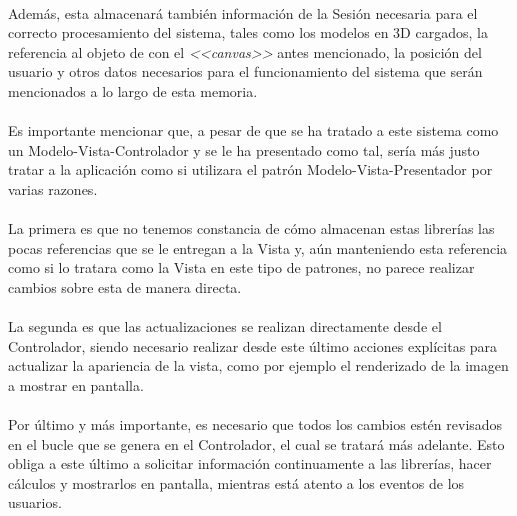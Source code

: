 \documentclass{subfiles}
\begin{document}
        \paragraph{}
        Además, esta almacenará también información de la Sesión necesaria para el correcto procesamiento del sistema, tales como los modelos en 3D cargados, la referencia al objeto de \js con el \textit{<<canvas>>} antes mencionado, la posición del usuario y otros datos necesarios para el funcionamiento del sistema que serán mencionados a lo largo de esta memoria.

        \paragraph{}
        Es importante mencionar que, a pesar de que se ha tratado a este sistema como un Modelo-Vista-Controlador y se le ha presentado como tal, sería más justo tratar a la aplicación como si utilizara el patrón Modelo-Vista-Presentador \cite{web:mvp} por varias razones.

        \paragraph{}
        La primera es que no tenemos constancia de cómo almacenan estas librerías las pocas referencias que se le entregan a la Vista y, aún manteniendo esta referencia como si lo tratara como la Vista en este tipo de patrones, no parece realizar cambios sobre esta de manera directa.

        \paragraph{}
        La segunda es que las actualizaciones se realizan directamente desde el Controlador, siendo necesario realizar desde este último acciones explícitas para actualizar la apariencia de la vista, como por ejemplo el renderizado de la imagen a mostrar en pantalla.

        \paragraph{}
        Por último y más importante, es necesario que todos los cambios estén revisados en el bucle que se genera en el Controlador, el cual se tratará más adelante. Esto obliga a este último a solicitar información continuamente a las librerías, hacer cálculos y mostrarlos en pantalla, mientras está atento a los eventos de los usuarios.
\end{document}
